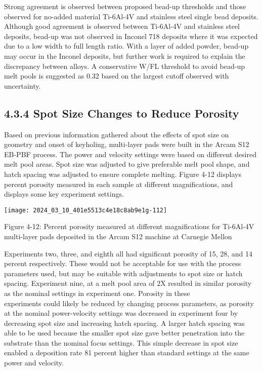 \documentclass[10pt]{article}
\begin{document}
Strong agreement is observed between proposed bead-up thresholds and those observed for no-added material Ti-6Al-4V and stainless steel single bead deposits. Although good agreement is observed between Ti-6Al-4V and stainless steel deposits, bead-up was not observed in Inconel 718 deposits where it was expected due to a low width to full length ratio. With a layer of added powder, bead-up may occur in the Inconel deposits, but further work is required to explain the discrepancy between alloys. A conservative W/FL threshold to avoid bead-up melt pools is suggested as 0.32 based on the largest cutoff observed with uncertainty.

\subsection*{4.3.4 Spot Size Changes to Reduce Porosity}
Based on previous information gathered about the effects of spot size on geometry and onset of keyholing, multi-layer pads were built in the Arcam S12 EB-PBF process. The power and velocity settings were based on different desired melt pool areas. Spot size was adjusted to give preferable melt pool shape, and hatch spacing was adjusted to ensure complete melting. Figure 4-12 displays percent porosity measured in each sample at different magnifications, and displays some key experiment settings.

\begin{center}
\texttt{[image: 2024\_03\_10\_401e5513c4e18c8ab9e1g-112]}
\end{center}

Figure 4-12: Percent porosity measured at different magnifications for Ti-6Al-4V multi-layer pads deposited in the Arcam S12 machine at Carnegie Mellon

Experiments two, three, and eighth all had significant porosity of 15, 28, and 14 percent respectively. These would not be acceptable for use with the process parameters used, but may be suitable with adjustments to spot size or hatch spacing. Experiment nine, at a melt pool area of $2 \mathrm{X}$ resulted in similar porosity as the nominal settings in experiment one. Porosity in these\\
experiments could likely be reduced by changing process parameters, as porosity at the nominal power-velocity settings was decreased in experiment four by decreasing spot size and increasing hatch spacing. A larger hatch spacing was able to be used because the smaller spot size gave better penetration into the substrate than the nominal focus settings. This simple decrease in spot size enabled a deposition rate 81 percent higher than standard settings at the same power and velocity.
\end{document}
